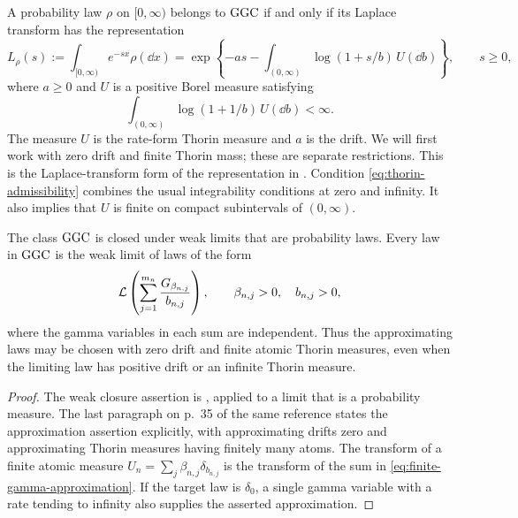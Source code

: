 A probability law \(\rho\) on \([0,\infty)\) belongs to \(\operatorname{GGC}\) if and only if its Laplace transform has the representation
\begin{equation}\label{eq:thorin-representation}
  L_\rho(s):=\int_{[0,\infty)}e^{-sx}\rho(\dd x)
  =\exp\left\{-as-\int_{(0,\infty)}
                  \log(1+s/b)\,U(\dd b)\right\},\qquad s\ge0,
\end{equation}
where \(a\ge0\) and \(U\) is a positive Borel measure satisfying
\begin{equation}\label{eq:thorin-admissibility}
  \int_{(0,\infty)}\log(1+1/b)\,U(\dd b)<\infty.
\end{equation}
The measure \(U\) is the rate-form Thorin measure and \(a\) is the drift.
We will first work with zero drift and finite Thorin mass; these are separate restrictions.
This is the Laplace-transform form of the representation in \cite[Section~3.1, p.~29, equations~(3.1.1)--(3.1.2)]{Bondesson1992}.
Condition \eqref{eq:thorin-admissibility} combines the usual integrability conditions at zero and infinity.
It also implies that \(U\) is finite on compact subintervals of \((0,\infty)\).

\begin{lemma}
\label{lem:ggc-closure}
The class \(\operatorname{GGC}\) is closed under weak limits that are probability laws.
Every law in \(\operatorname{GGC}\) is the weak limit of laws of the form
\begin{equation}\label{eq:finite-gamma-approximation}
  \mathcal L\left(\sum_{j=1}^{m_n}\frac{G_{\beta_{n,j}}}{b_{n,j}}\right),
  \qquad \beta_{n,j}>0,\quad b_{n,j}>0,
\end{equation}
where the gamma variables in each sum are independent.
Thus the approximating laws may be chosen with zero drift and finite atomic Thorin measures, even when the limiting law has positive drift or an infinite Thorin measure.
\end{lemma}

\begin{proof}
The weak closure assertion is \cite[Theorem~3.1.5, pp.~34--35]{Bondesson1992}, applied to a limit that is a probability measure.
The last paragraph on p.~35 of the same reference states the approximation assertion explicitly, with approximating drifts zero and approximating Thorin measures having finitely many atoms.
The transform of a finite atomic measure \(U_n=\sum_j\beta_{n,j}\delta_{b_{n,j}}\) is the transform of the sum in \eqref{eq:finite-gamma-approximation}.
If the target law is \(\delta_0\), a single gamma variable with a rate tending to infinity also supplies the asserted approximation.
\end{proof}

